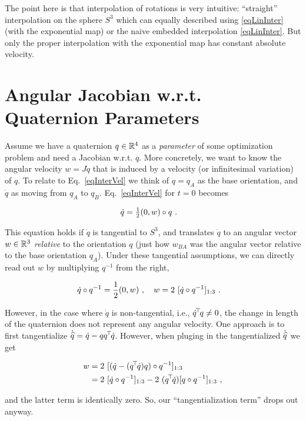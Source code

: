 The point here is that interpolation of rotations is very
intuitive: ``straight'' interpolation on the sphere $S^3$ which can
equally described using \eqref{eqLinInter} (with the exponential
map) or the naive embedded interpolation \eqref{eqLinInter}. But only the proper
interpolation with the exponential map has constant absolute velocity.

\section{Angular Jacobian w.r.t. Quaternion Parameters}

Assume we have a quaternion $q\in{\mathbb{R}}^4$ as a \emph{parameter} of some
optimization problem and need a Jacobian w.r.t. $q$. More concretely,
we want to know the angular
velocity $w = J \dot q$ that is induced by a velocity (or infinitesimal
variation) of $q$. To relate to Eq.~\eqref{eqInterVel} we think of
$q=q_A$ as the base orientation, and $\dot q$ as moving from $q_A$ to
$q_B$. Eq.~\eqref{eqInterVel} for $t=0$ becomes

\begin{align}
\dot q &= \textstyle\frac12 (0, w) \circ q ~.
\end{align}

This equation holds if $\dot q$ is tangential to $S^3$, and translates
$\dot q$ to an angular vector $w\in{\mathbb{R}}^3$ \emph{relative} to the
orientation $q$ (just how $w_{BA}$ was the angular vector relative to
the base orientation $q_A$). Under these tangential assumptions, we
can directly read out $w$ by multiplying $q^{-1}$ from the right,

\begin{align}
\dot q \circ q^{-1}
&= \frac{1}{2} (0,w) ~,\quad w = 2~ [\dot q \circ q^{-1}]_{1:3} ~.
\end{align}

However, in the case where $\dot q$ is non-tangential, i.e., $\dot q^{\!\top\!} q \not=0$,
the change in length of the quaternion does not represent any angular
velocity. One approach is to first tangentialize
$\dot {\widehat q} = \dot q - q q^{\!\top\!} \dot q$.
However, when pluging in the tangentialized
$\dot{\widehat q}$ we get

\begin{align}
w
&= 2~ [(\dot q - (q^{\!\top\!} \dot q) q)  \circ q^{-1}]_{1:3} \\
&= 2~ [\dot q \circ q^{-1}]_{1:3} - 2~ (q^{\!\top\!} \dot q) [q \circ q^{-1}]_{1:3} ~,
\end{align}

and the latter term is identically zero. So, our ``tangentialization term'' drops out anyway.

